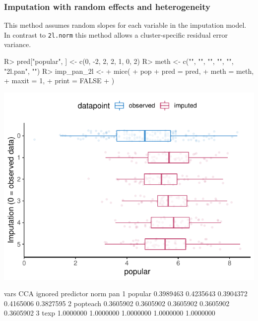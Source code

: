 \documentclass[
]{jss}
\begin{document}
\hypertarget{imputation-with-random-effects-and-heterogeneity}{%
\subsubsection{Imputation with random effects and
heterogeneity}\label{imputation-with-random-effects-and-heterogeneity}}

This method assumes random slopes for each variable in the imputation
model. In contrast to \texttt{2l.norm} this method allows a
cluster-specific residual error variance.

\begin{CodeChunk}
\begin{CodeInput}
R> pred["popular", ] <- c(0, -2, 2, 2, 1, 0, 2)
R> meth <- c("", "", "", "", "", "2l.pan", "")
R> imp_pan_2l <-
+   mice(
+     pop %
+     pred = pred,
+     meth = meth,
+     maxit = 1,
+     print = FALSE
+   )
\end{CodeInput}
\end{CodeChunk}

\begin{CodeChunk}


\begin{center}\includegraphics{Manuscript_files/figure-latex/pop_pan_eval-1} \end{center}

\begin{CodeOutput}
      vars       CCA   ignored predictor      norm       pan
1  popular 0.3989463 0.4235643 0.3904372 0.4165006 0.3827595
2 popteach 0.3605902 0.3605902 0.3605902 0.3605902 0.3605902
3     texp 1.0000000 1.0000000 1.0000000 1.0000000 1.0000000
\end{CodeOutput}
\end{CodeChunk}
\end{document}
